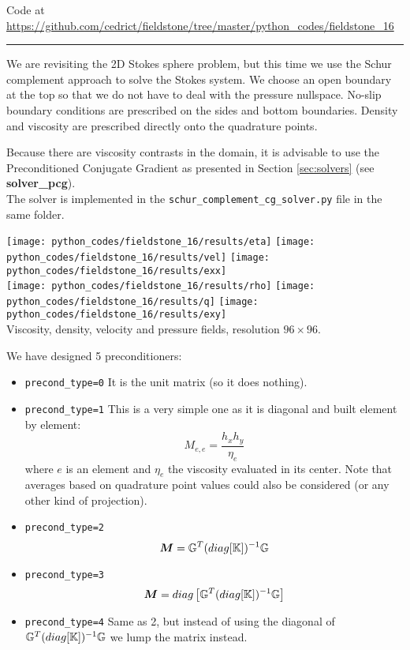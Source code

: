

\begin{center}
Code at \url{https://github.com/cedrict/fieldstone/tree/master/python_codes/fieldstone_16}
\end{center}

\par\noindent\rule{\textwidth}{0.4pt}


We are revisiting the 2D Stokes sphere problem, but this time 
we use the Schur complement approach to solve the Stokes system. 
We choose an open boundary at the top so that we do not have to deal with the pressure 
nullspace. No-slip boundary conditions are prescribed on the sides and bottom boundaries.
Density and viscosity are prescribed directly onto the quadrature points. 

Because there are viscosity contrasts in the domain, it is advisable 
to use the Preconditioned Conjugate Gradient 
as presented in Section \ref{sec:solvers} (see {\bf solver\_pcg}).\\
The solver is implemented in the {\tt schur\_complement\_cg\_solver.py} file in the same folder.  

\begin{center} 
\texttt{[image: python\_codes/fieldstone\_16/results/eta]}
\texttt{[image: python\_codes/fieldstone\_16/results/vel]}
\texttt{[image: python\_codes/fieldstone\_16/results/exx]}\\
\texttt{[image: python\_codes/fieldstone\_16/results/rho]}
\texttt{[image: python\_codes/fieldstone\_16/results/q]}
\texttt{[image: python\_codes/fieldstone\_16/results/exy]}\\
{\captionfont Viscosity, density, velocity and pressure fields, resolution $96\times 96$.}
\end{center} 

We have designed 5 preconditioners:
\begin{itemize}
\item {\tt precond\_type=0} It is the unit matrix (so it does nothing). 
\item {\tt precond\_type=1} This is a very simple one as it is
diagonal and built element by element:
\[
M_{e,e} = \frac{h_x h_y}{\eta_e} 
\]
where $e$ is an element and $\eta_e$ the viscosity evaluated in its center. Note that 
averages based on quadrature point values could also be considered (or any other kind of projection).
\item {\tt precond\_type=2}
\[
{\bm M} = {\mathbb{G}}^T (diag [{\mathbb{K}}]  )^{-1} {\mathbb{G}} 
\]
\item {\tt precond\_type=3} 
\[
{\bm M} = diag \left[ {\mathbb{G}}^T (diag [{\mathbb{K}}]  )^{-1} {\mathbb{G}} \right]
\]
\item {\tt precond\_type=4} Same as 2, but instead of using the 
diagonal of $ {\mathbb{G}}^T (diag [{\mathbb{K}}]  )^{-1} {\mathbb{G}}$ we lump the matrix instead.

\end{itemize}


